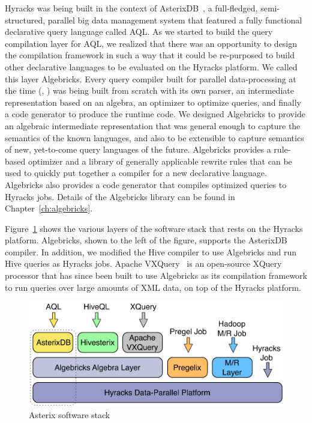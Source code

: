 Hyracks was being built in the context of AsterixDB~\cite{ASTERIX}, a full-fledged, semi-structured, parallel big data management system that featured a fully functional declarative query language called AQL. As we started to build the query compilation layer for AQL, we realized that there was an opportunity to design the compilation framework in such a way that it could be re-purposed to build other declarative languages to be evaluated on the Hyracks platform. We called this layer Algebricks. Every query compiler built for parallel data-processing at the time (\cite{hive}, \cite{conf/sigmod/OlstonRSKT08}) was being built from scratch with its own parser, an intermediate representation based on an algebra, an optimizer to optimize queries, and finally a code generator to produce the runtime code. We designed Algebricks to provide an algebraic intermediate representation that was general enough to capture the semantics of the known languages, and also to be extensible to capture semantics of new, yet-to-come query languages of the future. Algebricks provides a rule-based optimizer and a library of generally applicable rewrite rules that can be used to quickly put together a compiler for a new declarative language. Algebricks also provides a code generator that compiles optimized queries to Hyracks jobs. Details of the Algebricks library can be found in Chapter~\ref{ch:algebricks}.

Figure~\ref{fig:asterixdb_stack} shows the various layers of the software stack that rests on the Hyracks platform. Algebricks, shown to the left of the figure, supports the AsterixDB compiler. In addition, we modified the Hive compiler to use Algebricks and run Hive queries as Hyracks jobs. Apache VXQuery~\cite{DBLP:conf/bigdataconf/CarmanWBCT15} is an open-source XQuery processor that has since been built to use Algebricks as its compilation framework to run queries over large amounts of XML data, on top of the Hyracks platform.

\begin{figure}[htb]
\centering
\includegraphics[width=6in]{images/asterixdb_stack}
\caption{Asterix software stack\label{fig:asterixdb_stack}}
\end{figure}

